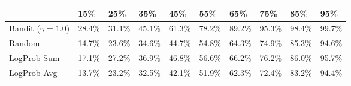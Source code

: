 \begin{tabular}{lYYYYYYYYY}
\toprule
 & 15\% & 25\% & 35\% & 45\% & 55\% & 65\% & 75\% & 85\% & 95\%\\
\midrule
Bandit ($\gamma=1.0$) & 
28.4\% & 31.1\% & 45.1\% & 61.3\% & 78.2\% & 89.2\% & 95.3\% & 98.4\% & 99.7\%\\
Random & 
14.7\% & 23.6\% & 34.6\% & 44.7\% & 54.8\% & 64.3\% & 74.9\% & 85.3\% & 94.6\%\\
LogProb Sum & 
17.1\% & 27.2\% & 36.9\% & 46.8\% & 56.6\% & 66.2\% & 76.2\% & 86.0\% & 95.7\%\\
LogProb Avg & 
13.7\% & 23.2\% & 32.5\% & 42.1\% & 51.9\% & 62.3\% & 72.4\% & 83.2\% & 94.4\%\\
\bottomrule\end{tabular}
